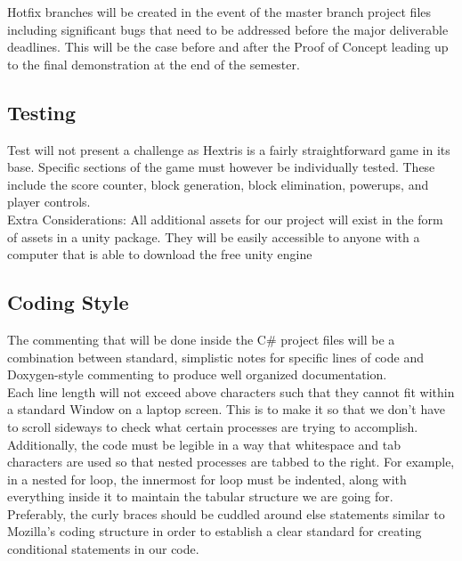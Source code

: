 \documentclass[12pt]{article}
\begin{document}
Hotfix branches will be created in the event of the master branch project files including significant bugs that need to be addressed before the major deliverable deadlines. This will be the case before and after the Proof of Concept leading up to the final demonstration at the end of the semester. \\

\newpage

\subsection{Testing}
Test will not present a challenge as Hextris is a fairly straightforward game in its base. Specific sections of the game must however be individually tested. These include the score counter, block generation, block elimination, powerups, and player controls.\\

Extra Considerations: All additional assets for our project will exist in the form of assets in a unity package. They will be easily accessible to anyone with a computer that is able to download the free unity engine 

\subsection{Coding Style}
The commenting that will be done inside the C\# project files will be a combination between standard, simplistic notes for specific lines of code and Doxygen-style commenting to produce well organized documentation.\\

Each line length will not exceed above characters such that they cannot fit within a standard Window on a laptop screen. This is to make it so that we don’t have to scroll sideways to check what certain processes are trying to accomplish. Additionally, the code must be legible in a way that whitespace and tab characters are used so that nested processes are tabbed to the right. For example, in a nested for loop, the innermost for loop must be indented, along with everything inside it to maintain the tabular structure we are going for. \\

Preferably, the curly braces should be cuddled around else statements similar to Mozilla’s coding structure in order to establish a clear standard for creating conditional statements in our code. \\
\end{document}
